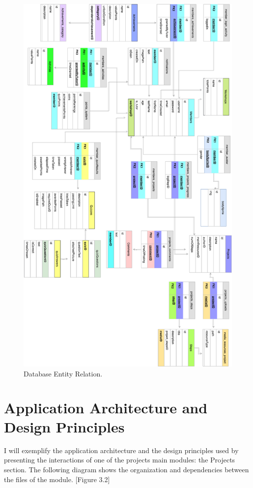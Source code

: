 \begin{figure}
\includegraphics[width=1\linewidth]{images/EntityRelation.png}
\caption{Database Entity Relation.}
\label{fig:entity_relation}
\end{figure}


\section{Application Architecture and Design Principles}

I will exemplify the application architecture and the design principles used by presenting the interactions of one of the projects main modules: the Projects section. The following diagram shows the organization and dependencies between the files of the module. [Figure 3.2]

